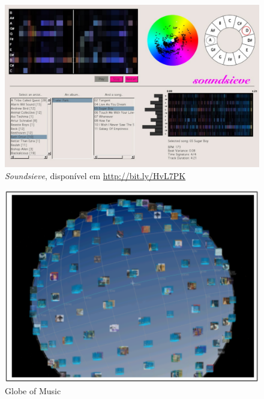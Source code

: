 \documentclass{sciposter}
\begin{document}
\begin{multicols}{2}
\begin{figure}
  \centering
  \includegraphics{./figs/soundsieve.pdf}
  \caption{\textit{Soundsieve}, disponível em \url{http://bit.ly/HvL7PK}}
  \label{fig:label-figura}
\end{figure}

\begin{figure}
  \centering
  \includegraphics{./figs/topf-globe.pdf}
  \caption{Globe of Music \cite{Leitich2007}}
  \label{fig:label-figura}
\end{figure}


\end{multicols}
\end{document}
